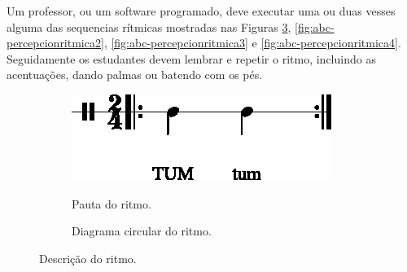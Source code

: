 \begin{example}
Um professor, ou um software programado, 
deve executar uma ou duas vesses alguma das sequencias rítmicas mostradas nas Figuras 
\ref{fig:abc-percepcionritmica1}, \ref{fig:abc-percepcionritmica2},
\ref{fig:abc-percepcionritmica3}  e \ref{fig:abc-percepcionritmica4}.
Seguidamente os estudantes devem lembrar e repetir o ritmo, 
incluindo as acentuações, dando palmas ou batendo com os pés.
\end{example}


\begin{figure}[H]
\centering
     \begin{subfigure}[c]{0.45\textwidth}
         \centering
         \href{https://drive.google.com/file/d/1c7OawI0qFdiDDiskMlfJAh-l5GYBKVzQ/view?usp=sharing}{\includegraphics[width=\textwidth]{chapters/cap-musicalidade-percepcion/treino-ritmo1-1.eps}}
         \caption{Pauta do ritmo.}
         \label{fig:RitmoTUMtum1}
     \end{subfigure}
     \hfill
     \begin{subfigure}[c]{0.45\textwidth}
         \centering
{}
         \caption{Diagrama circular do ritmo.}
         \label{fig:RitmoTUMtum2}
     \end{subfigure}
\caption{Descrição do ritmo.}
\label{fig:abc-percepcionritmica1}
\end{figure}


